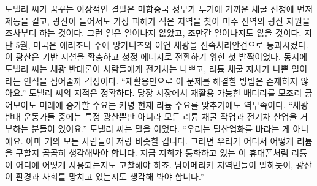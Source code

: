 \documentclass{translation}
\begin{document}
도넬리 씨가 꿈꾸는 이상적인 결말은 미합중국 정부가 투기에 가까운 채굴 신청에 먼저 제동을 걸고, 광산이 들어서도 가장 피해가 적은 지역을 찾아 미주 전역의 광산 자원을 조사부터 하는 것이다.
그런 일은 일어나지 않았고, 조만간 일어나지도 않을 것이다.
지난 5월, 미국은 애리조나 주에 망가니즈와 아연 채광을 신속처리안건으로 통과시켰다.
이 광산은 기반 시설을 확충하고 청정 에너지로 전환하기 위한 첫 발짝이었다.
동시에 도넬리 씨는 채광 반대론이 사람들에게 전기차는 나쁘고, 리튬 채굴 자체가 나쁜 일이라는 인식을 심어줄까 걱정이다.
``재활용만으로 이 문제를 해결할 방법은 존재하지 않아요.''
도넬리 씨의 지적은 정확하다.
당장 시장에서 재활용 가능한 배터리를 모조리 긁어모아도 미래에 증가할 수요는 커녕 현재 리튬 수요를 맞추기에도 역부족이다.
``채광 반대 운동가들 중에는 특정 광산뿐만 아니라 모든 리튬 채굴 작업과 전기차 산업을 거부하는 분들이 있어요.''
도넬리 씨는 말을 이었다.
``우리는 탈산업화를 바라는 게 아니에요. 아마 거의 모든 사람들이 저랑 비슷할 겁니다. 그러면 우리가 어디서 어떻게 리튬을 구할지 곰곰히 생각해봐야 합니다. 지금 저희가 통화하고 있는 이 휴대폰처럼 리튬이 어디에 어떻게 사용되는지도 고찰해야 하죠. 남아메리카 지역민들이 말하듯이, 광산이 환경과 사회를 망치고 있는지도 생각해 봐야 합니다.''
% 
\end{document}

